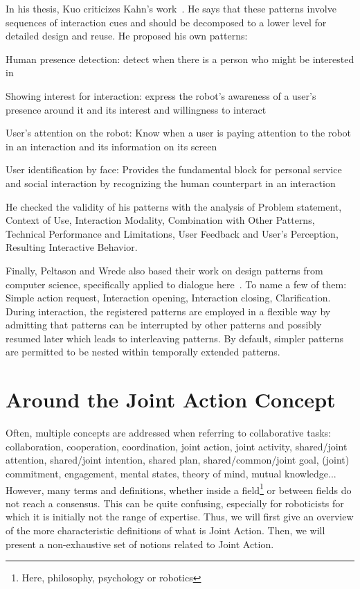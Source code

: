 \documentclass[a4paper,11pt,twoside]{StyleThese}
\begin{document}
In his thesis, Kuo criticizes Kahn’s work~\cite{kuo_2012_designing}. He says that these patterns involve sequences of interaction cues and should be decomposed to a lower level for detailed design and reuse. He proposed his own patterns:
\begin{bulletList}
	\item Human presence detection: detect when there is a person who might be interested in
	\item Showing interest for interaction: express the robot’s awareness of a user’s presence around it and its interest and willingness to interact
	\item User’s attention on the robot: Know when a user is paying attention to the robot in an interaction and its information on its screen
	\item User identification by face: Provides the fundamental block for personal service and social interaction by recognizing the human counterpart in an interaction
\end{bulletList}
He checked the validity of his patterns with the analysis of Problem statement, Context of Use, Interaction Modality, Combination with Other Patterns, Technical Performance and Limitations, User Feedback and User’s Perception, Resulting Interactive Behavior.

Finally, Peltason and Wrede also based their work on design patterns from computer science, specifically applied to dialogue here~\cite{peltason_2010_pamini}. To name a few of them: Simple action request, Interaction opening, Interaction closing, Clarification. During interaction, the registered patterns are employed in a flexible way by admitting that patterns can be interrupted by other patterns and possibly resumed later which leads to interleaving patterns. By default, simpler patterns are permitted to be nested within temporally extended patterns.

\section{Around the Joint Action Concept}
Often, multiple concepts are addressed when referring to collaborative tasks: collaboration, cooperation, coordination, joint action, joint activity, shared/joint attention, shared/joint intention, shared plan, shared/common/joint goal, (joint) commitment, engagement, mental states, theory of mind, mutual knowledge... However, many terms and definitions, whether inside a field\footnote{Here, philosophy, psychology or robotics} or between fields do not reach a consensus. This can be quite confusing, especially for roboticists for which it is initially not the range of expertise. Thus, we will first give an overview of the more characteristic definitions of what is Joint Action. Then, we will present a non-exhaustive set of notions related to Joint Action. 
\end{document}
